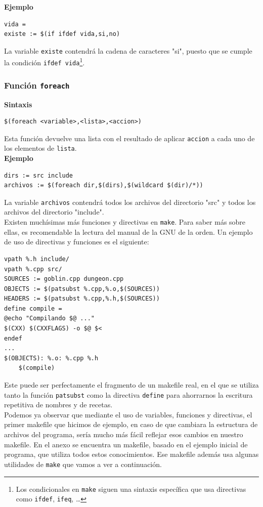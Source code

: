 \documentclass[11pt,twoside,titlepage,a4paper]{article}
\theoremstyle{definition}
\theoremstyle{plain_rojo}
\theoremstyle{remark}
\begin{document}
\textbf{\textcolor{burdeos}{Ejemplo}}
\begin{lstlisting}
vida =
existe := $(if ifdef vida,si,no)
\end{lstlisting}
La variable \texttt{existe} contendrá la cadena de caracteres "si", puesto
que se cumple la condición \texttt{ifdef vida}\footnote{Los condicionales en
\texttt{make} siguen una sintaxis específica que usa directivas como 
\texttt{ifdef}, \texttt{ifeq}, \dots}.

\subsubsection{Función \texttt{foreach}}

\textbf{\textcolor{burdeos}{Sintaxis}}
\begin{lstlisting}
$(foreach <variable>,<lista>,<accion>)
\end{lstlisting}
Esta función devuelve una lista con el resultado de aplicar \texttt{accion}
a cada uno de los elementos de \texttt{lista}.
\\

\textbf{\textcolor{burdeos}{Ejemplo}}
\begin{lstlisting}
dirs := src include
archivos := $(foreach dir,$(dirs),$(wildcard $(dir)/*))
\end{lstlisting}
La variable \texttt{archivos} contendrá todos los archivos del directorio 
"src" y todos los archivos del directorio "include".
\\

Existen muchísimas más funciones y directivas en \texttt{make}. Para saber
más sobre ellas, es recomendable la lectura del manual de la GNU de la orden.
Un ejemplo de uso de directivas y funciones es el siguiente:
\bigskip
\begin{lstlisting}
vpath %.h include/
vpath %.cpp src/
SOURCES := goblin.cpp dungeon.cpp
OBJECTS := $(patsubst %.cpp,%.o,$(SOURCES))
HEADERS := $(patsubst %.cpp,%.h,$(SOURCES))
define compile =
@echo "Compilando $@ ..."
$(CXX) $(CXXFLAGS) -o $@ $<
endef
...
$(OBJECTS): %.o: %.cpp %.h
	$(compile)
\end{lstlisting}
\bigskip
Este puede ser perfectamente el fragmento de un makefile real, en el que
se utiliza tanto la función \texttt{patsubst} como la directiva 
\texttt{define} para ahorrarnos la escritura repetitiva de nombres y de 
recetas.
\\

Podemos ya observar que mediante el uso de variables, funciones y directivas,
el primer makefile que hicimos de ejemplo, en caso de que cambiara la
estructura de archivos del programa, sería mucho más fácil reflejar esos
cambios en nuestro makefile. En el anexo se encuentra un makefile, basado
en el ejemplo inicial de programa, que utiliza todos estos conocimientos.
Ese makefile además usa algunas utilidades de \texttt{make} que vamos a ver
a continuación.
\end{document}
